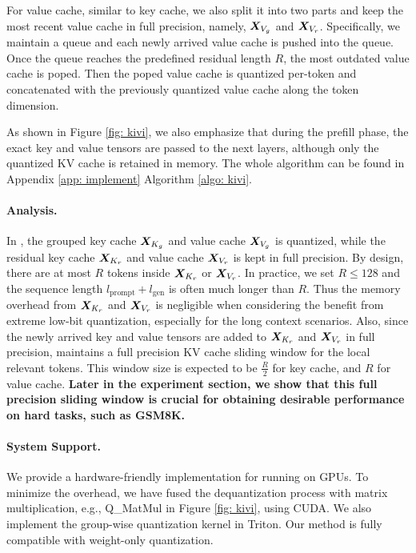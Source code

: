 For value cache, similar to key cache, we also split it into two parts and keep the most recent value cache in full precision, namely, ${\bm{X}}_{V_g}$ and ${\bm{X}}_{V_r}$. Specifically, we maintain a queue and each newly arrived value cache is pushed into the queue. 
Once the queue reaches the predefined residual length $R$, the most outdated value cache is poped. Then the poped value cache is quantized per-token and concatenated with the previously quantized value cache along the token dimension. 

As shown in Figure \ref{fig: kivi}, we also emphasize that during the prefill phase, the exact key and value tensors are passed to the next layers, although only the quantized KV cache is retained in memory.
The whole algorithm can be found in Appendix \ref{app: implement} Algorithm \ref{algo: kivi}.

\paragraph{Analysis.}
In \kivi{}, the grouped key cache ${\bm{X}}_{K_g}$ and value cache ${\bm{X}}_{V_g}$ is quantized, while the residual key cache ${\bm{X}}_{K_r}$ and value cache ${\bm{X}}_{V_r}$ is kept in full precision.
By design, there are at most $R$ tokens inside ${\bm{X}}_{K_r}$ or ${\bm{X}}_{V_r}$. In practice, we set $R \leq 128$ and the sequence length $l_{\text{prompt}}+l_{\text{gen}}$ is often much longer than $R$.
Thus the memory overhead from ${\bm{X}}_{K_r}$ and ${\bm{X}}_{V_r}$ is negligible when considering the benefit from extreme low-bit quantization, especially for the long context scenarios.
Also, since the newly arrived key and value tensors are added to ${\bm{X}}_{K_r}$ and ${\bm{X}}_{V_r}$ in full precision, \kivi{} maintains a full precision KV cache sliding window for the local relevant tokens.
This window size is expected to be $\frac{R}{2}$ for key cache, and $R$ for value cache.
\textbf{Later in the experiment section, we show that this full precision sliding window is crucial for obtaining desirable performance on hard tasks, such as GSM8K.}

\paragraph{System Support.}
We provide a hardware-friendly implementation for running \kivi{} on GPUs.
To minimize the overhead, we have fused the dequantization process with matrix multiplication, e.g., Q\_MatMul in Figure \ref{fig: kivi}, using CUDA. 
We also implement the group-wise quantization kernel in Triton.
Our method is fully compatible with weight-only quantization.
